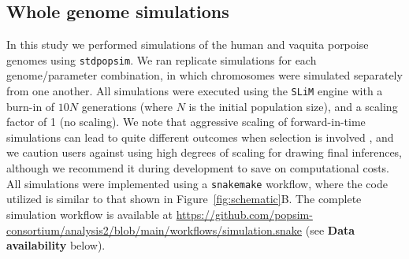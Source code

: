 \documentclass[hidelinks]{article}
\newcommand{\stdpopsim}{\texttt{stdpopsim}\xspace}
\newcommand{\slim}{\texttt{SLiM}\xspace}
\newcommand{\snakemake}{\texttt{snakemake}\xspace}
\begin{document}
    \subsection*{Whole genome simulations}
    In this study we performed simulations of the human and vaquita porpoise genomes
    using \stdpopsim{}. We ran replicate simulations for each genome/parameter combination,
    in which chromosomes were simulated separately from one another.
    All simulations were executed using the \slim engine with a burn-in of $10N$ generations
    (where $N$ is the initial population size), and a scaling factor of 1 (no scaling).
    We note that aggressive scaling of forward-in-time simulations
    can lead to quite different outcomes when selection is involved
    \citep{uricchio2014robust,ferrari2024towards, dabi2025population},
    and we caution users against using high degrees of scaling for drawing
    final inferences, although we recommend it during development to save
    on computational costs. 
    All simulations were implemented using a \snakemake workflow,
    where the code utilized is similar to that shown in Figure~\ref{fig:schematic}B.
    The complete simulation workflow is available at \url{https://github.com/popsim-consortium/analysis2/blob/main/workflows/simulation.snake}
    (see \textbf{Data availability} below).
\end{document}
